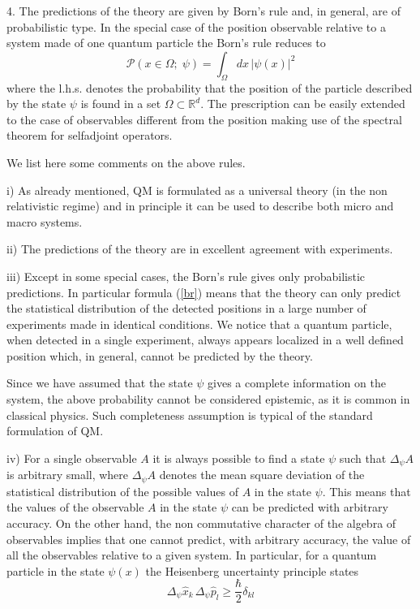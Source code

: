 \documentclass[12pt,reqno]{amsart}
\newcommand{\erre}{\mathbb{R}}
\newcommand{\n}{\relax}
\newcommand{\vs}{\medskip}
\newcommand{\f}{\frac}
\newcommand{\be}{\begin{equation}}
\newcommand{\ee}{\end{equation}}
\numberwithin{equation}{section}
\begin{document}
4. The predictions of the theory are given by  Born's rule and, in general, are of probabilistic type. 
In the special case of the position observable relative to a system made of one quantum particle  the Born's rule reduces to
\be\label{br}
{\mathcal P}(x \in \Omega; \; \psi)= \int_{\Omega} \!dx \, |\psi (x)|^2
\ee
where the l.h.s. denotes the probability that the position of the  particle described by the state $\psi$ is found in a  set $\Omega \subset \erre^d$.  
The prescription can be easily extended to the case of  observables different from the position making use of the spectral theorem for selfadjoint operators.

\vs


\noindent
We list here some comments on the above rules. 
\vs

i)  As already mentioned, QM is formulated as a universal theory (in the non relativistic regime) and in principle it can be used to describe both micro and macro systems.


ii)  The predictions of the theory are in excellent agreement with experiments.


iii) Except in some special cases, the Born's rule gives only probabilistic predictions. In particular formula (\ref{br}) means that the theory can only predict the statistical distribution of the detected positions in a large number of experiments made in identical conditions. We notice  that a quantum particle, when detected in a single experiment, always appears localized in a well defined position which, in general, cannot be predicted by the theory. 




\n
Since we have assumed that the state $\psi$ gives a complete information on the system, the above probability cannot be considered epistemic, as it is common in classical physics.  Such  completeness assumption is typical of the standard formulation of QM.



iv)  For a single observable $A$ it is always possible to find a state $\psi$ such that $\Delta_{\psi} A$ is arbitrary small, where $\Delta_{\psi} A$ denotes the mean square deviation of the statistical distribution of the possible values of $A$ in the state $\psi$. This means that the values of the observable $A$ in the state $\psi $ can be predicted with arbitrary accuracy.  On the other hand, the non commutative character of the algebra of observables implies that one cannot predict, with arbitrary accuracy, the value of all the observables relative to a given system. In particular, for a quantum particle in the state $\psi(x)$  the Heisenberg uncertainty principle states
\be\label{ind}
\Delta_{\psi} \hat{x}_k \, \Delta_{\psi} \hat{p}_l \geq \f{\hbar}{2} \delta_{kl}
\ee
\end{document}
